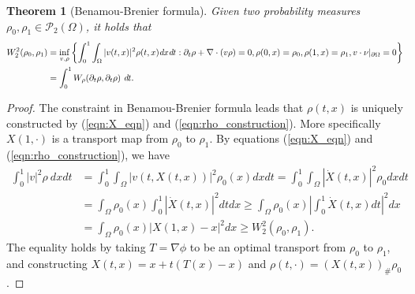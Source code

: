 \documentclass[11pt]{book}
\newtheorem{theorem}{Theorem}[section]
\begin{document}
\begin{theorem}[Benamou-Brenier formula]
Given two probability measures $\rho_0,\rho_1 \in \mathcal{P}_2(\Omega)$, it holds that
\begin{align*}
W_2^2(\rho_0,\rho_1) &= \inf_{v,\rho} \left\{ \int_0^1 \int_{\Omega} |v(t,x)|^2 \rho(t,x)\emph{d}x\emph{d}t: \partial_t\rho + \nabla\cdot(v\rho) = 0, \rho(0,x) = \rho_0, \rho(1,x) = \rho_1, v\cdot\nu|_{\partial\Omega} = 0 \right\}\\
& = \int_0^1 W_{\rho}(\partial_t\rho,\partial_t\rho)\ \emph{d}t.
\end{align*}
\end{theorem}
\begin{proof}
The constraint in Benamou-Brenier formula leads that $\rho(t,x)$ is uniquely constructed by (\ref{eqn:X_eqn}) and (\ref{eqn:rho_construction}). More specifically $X(1,\cdot)$ is a transport map from $\rho_0$ to $\rho_1$. By equations (\ref{eqn:X_eqn}) and (\ref{eqn:rho_construction}), we have
\begin{align*}
\int_0^1 |v|^2 \rho\ dxdt &= \int_0^1 \int_{\Omega} |v(t,X(t,x))|^2 \rho_0(x) dxdt = \int_0^1 \int_{\Omega} |\dot{X}(t,x)|^2 \rho_0 dxdt  \\
& = \int_{\Omega} \rho_0(x) \int_0^1 |\dot{X}(t,x)|^2 dtdx \ge \int_{\Omega} \rho_0(x) \left|\int_0^1 \dot{X}(t,x) dt \right|^2 dx\\
& = \int_{\Omega} \rho_0(x) |X(1,x) - x|^2 dx \ge W_2^2(\rho_0,\rho_1).
\end{align*}
The equality holds by taking $T = \nabla\phi$ to be an optimal transport from $\rho_0$ to $\rho_1$, and constructing $X(t,x) = x + t(T(x) - x)$ and $\rho(t,\cdot) = (X(t,x))_{\#}\rho_0$.

\end{proof}
\end{document}

